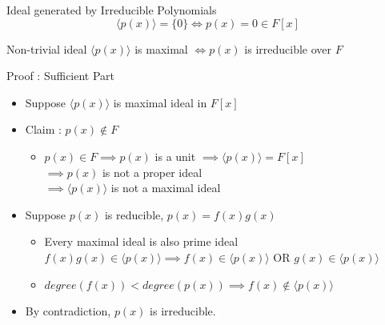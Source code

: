 \documentclass{beamer}
\begin{document}
\begin{frame}{Ideal generated by Irreducible Polynomials}
	$$\langle p(x) \rangle = \{ 0 \} \iff p(x) = 0 \in F[x]$$
\begin{theorem}
	Non-trivial ideal $\langle p(x) \rangle$ is maximal $\iff p(x)$ is irreducible over $F$
\end{theorem}
\begin{block}{Proof : Sufficient Part}
\begin{itemize}
	\item Suppose $\langle p(x) \rangle$ is maximal ideal in $F[x]$
	\item Claim : $p(x) \notin F$
	\begin{itemize}
		\item $p(x) \in F \implies p(x)$ is a unit $\implies \langle p(x) \rangle = F[x]$\\
		$\implies p(x)$ is not a proper ideal\\
		$\implies \langle p(x) \rangle$ is not a maximal ideal
	\end{itemize}
	\item Suppose $p(x)$ is reducible, $p(x) = f(x)g(x)$
	\begin{itemize}
		\item Every maximal ideal is also prime ideal \\
		$f(x)g(x) \in \langle p(x) \rangle \implies f(x) \in \langle p(x) \rangle$ OR $g(x) \in \langle p(x) \rangle$
		\item $degree(f(x)) < degree(p(x)) \implies f(x) \notin \langle p(x) \rangle$
	\end{itemize}
	\item By contradiction, $p(x)$ is irreducible.
\end{itemize}
\end{block}
\end{frame}
\end{document}
